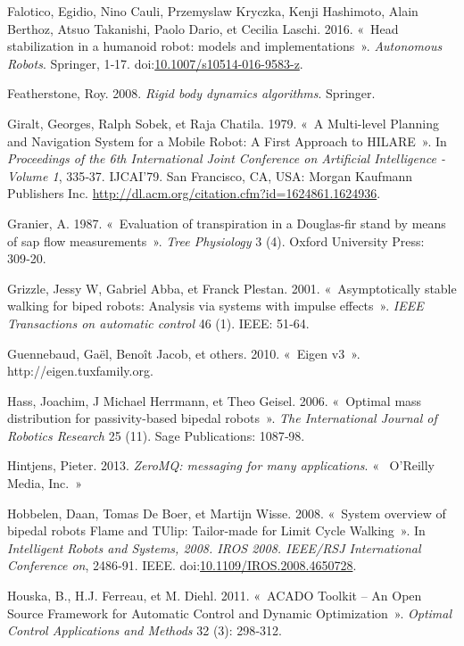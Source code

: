 \documentclass[french,A4paper,]{book}
\begin{document}
\hypertarget{ref-falotico16}{}
Falotico, Egidio, Nino Cauli, Przemyslaw Kryczka, Kenji Hashimoto, Alain
Berthoz, Atsuo Takanishi, Paolo Dario, et Cecilia Laschi. 2016. «~Head
stabilization in a humanoid robot: models and implementations~».
\emph{Autonomous Robots}. Springer, 1‑17.
doi:\href{https://doi.org/10.1007/s10514-016-9583-z}{10.1007/s10514-016-9583-z}.

\hypertarget{ref-featherstone08}{}
Featherstone, Roy. 2008. \emph{Rigid body dynamics algorithms}.
Springer.

\hypertarget{ref-giralt79}{}
Giralt, Georges, Ralph Sobek, et Raja Chatila. 1979. «~A Multi-level
Planning and Navigation System for a Mobile Robot: A First Approach to
HILARE~». In \emph{Proceedings of the 6th International Joint Conference
on Artificial Intelligence - Volume 1}, 335‑37. IJCAI'79. San Francisco,
CA, USA: Morgan Kaufmann Publishers Inc.
\url{http://dl.acm.org/citation.cfm?id=1624861.1624936}.

\hypertarget{ref-granier}{}
Granier, A. 1987. «~Evaluation of transpiration in a Douglas-fir stand
by means of sap flow measurements~». \emph{Tree Physiology} 3 (4).
Oxford University Press: 309‑20.

\hypertarget{ref-grizzle01}{}
Grizzle, Jessy W, Gabriel Abba, et Franck Plestan. 2001.
«~Asymptotically stable walking for biped robots: Analysis via systems
with impulse effects~». \emph{IEEE Transactions on automatic control} 46
(1). IEEE: 51‑64.

\hypertarget{ref-eigenweb}{}
Guennebaud, Gaël, Benoît Jacob, et others. 2010. «~Eigen v3~».
http://eigen.tuxfamily.org.

\hypertarget{ref-hass06}{}
Hass, Joachim, J Michael Herrmann, et Theo Geisel. 2006. «~Optimal mass
distribution for passivity-based bipedal robots~». \emph{The
International Journal of Robotics Research} 25 (11). Sage Publications:
1087‑98.

\hypertarget{ref-zeromq}{}
Hintjens, Pieter. 2013. \emph{ZeroMQ: messaging for many applications}.
«~ O'Reilly Media, Inc.~»

\hypertarget{ref-hobbelen08}{}
Hobbelen, Daan, Tomas De Boer, et Martijn Wisse. 2008. «~System overview
of bipedal robots Flame and TUlip: Tailor-made for Limit Cycle
Walking~». In \emph{Intelligent Robots and Systems, 2008. IROS 2008.
IEEE/RSJ International Conference on}, 2486‑91. IEEE.
doi:\href{https://doi.org/10.1109/IROS.2008.4650728}{10.1109/IROS.2008.4650728}.

\hypertarget{ref-acado}{}
Houska, B., H.J. Ferreau, et M. Diehl. 2011. «~ACADO Toolkit -- An Open
Source Framework for Automatic Control and Dynamic Optimization~».
\emph{Optimal Control Applications and Methods} 32 (3): 298‑312.
\end{document}
